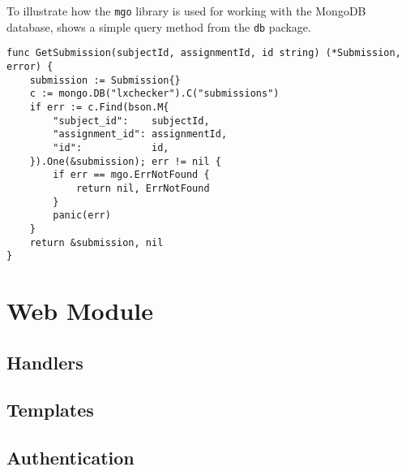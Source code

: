 To illustrate how the \texttt{mgo} library is used for working with the MongoDB database,  shows a simple query method from the \texttt{db} package.

\lstset{language=Golang,caption=GetSubmission query method,label=lst:get-submission}
\begin{lstlisting}
func GetSubmission(subjectId, assignmentId, id string) (*Submission, error) {
	submission := Submission{}
	c := mongo.DB("lxchecker").C("submissions")
	if err := c.Find(bson.M{
		"subject_id":    subjectId,
		"assignment_id": assignmentId,
		"id":            id,
	}).One(&submission); err != nil {
		if err == mgo.ErrNotFound {
			return nil, ErrNotFound
		}
		panic(err)
	}
	return &submission, nil
}
\end{lstlisting}


\section{Web Module}
\label{sec:web-module}


\subsection{Handlers}
\label{sub-sec:handlers}


\subsection{Templates}
\label{sub-sec:templates}


\subsection{Authentication}
\label{sub-sec:authentication}

